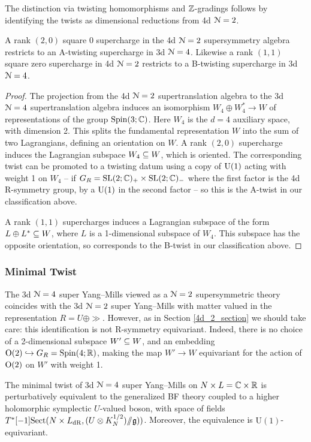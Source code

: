 \documentclass[10pt, oneside]{article}
\renewcommand{\U}{\mathrm{U}}
\newcommand{\ham}{/\!\!/}
\begin{document}
The distinction via twisting homomorphisms and $\mathbb Z$-gradings follows by identifying the twists as dimensional reductions from 4d $\mathcal{N}=2$.
 
\begin{lemma} \label{3d_4_orbits_lemma}
A rank $(2,0)$ square 0 supercharge in the 4d $\mathcal{N}=2$ supersymmetry algebra restricts to an A-twisting supercharge in 3d $\mathcal{N}=4$.  Likewise a rank $(1,1)$ square zero supercharge in 4d $\mathcal{N}=2$ restricts to a B-twisting supercharge in 3d $\mathcal{N}=4$.
\end{lemma}

\begin{proof}
The projection from the 4d $\mathcal{N}=2$ supertranslation algebra to the 3d $\mathcal{N}=4$ supertranslation algebra induces an isomorphism $W_4 \oplus W_4^* \to W$ of representations of the group $\mathrm{Spin}(3;\mathbb C)$. Here $W_4$ is the $d=4$ auxiliary space, with dimension 2.  This splits the fundamental representation $W$ into the sum of two Lagrangians, defining an orientation on $W$. A rank $(2,0)$ supercharge induces the Lagrangian subspace $W_4 \subseteq W$, which is oriented.  The corresponding twist can be promoted to a twisting datum using a copy of $\mathrm{U}(1)$ acting with weight 1 on $W_4$ -- if $G_R = \mathrm{SL}(2;\mathbb C)_+ \times \mathrm{SL}(2;\mathbb C)_-$ where the first factor is the 4d R-symmetry group, by a $\mathrm{U}(1)$ in the second factor -- so this is the A-twist in our classification above.

A rank $(1,1)$ supercharges induces a Lagrangian subspace of the form $L \oplus L^* \subseteq W$, where $L$ is a 1-dimensional subspace of $W_4$.  This subspace has the opposite orientation, so corresponds to the B-twist in our classification above.  
\end{proof}

\subsubsection{Minimal Twist}
\label{sect:3d_4_minimal_twist}
The 3d $\mathcal N=4$ super Yang--Mills viewed as a $\mathcal N=2$ supersymmetric theory coincides with the 3d $\mathcal N=2$ super Yang--Mills with matter valued in the representation $R = U \oplus \gg$.  However, as in Section \ref{4d_2_section} we should take care: this identification is not R-symmetry equivariant.  Indeed, there is no choice of a 2-dimensional subspace $W' \subseteq W$, and an embedding $\mathrm{O}(2) \hookrightarrow G_R = \mathrm{Spin}(4;\mathbb R)$, making the map $W' \to W$ equivariant for the action of $\mathrm{O}(2)$ on $W'$ with weight 1.

\begin{theorem} \label{3d_4_minimal_twist_thm}
The minimal twist of 3d $\mathcal N=4$ super Yang--Mills on $N \times L=\mathbb C\times \mathbb R$ is perturbatively equivalent to the generalized BF theory coupled to a higher holomorphic symplectic $U$-valued boson, with space of fields $T^*[-1]\mr{Sect}(N \times L_{\mr{dR}}, (U \otimes K^{1/2}_N) \ham \gg))$. Moreover, the equivalence is $\U(1)$-equivariant.
\end{theorem}
\end{document}
